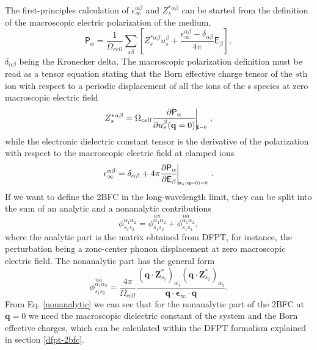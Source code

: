 The first-principles calculation of $\epsilon_{\infty}^{\alpha\beta}$ and $Z_{s}^{*\alpha\beta}$ can be started from the definition of the macroscopic electric polarization of the medium, 
\begin{equation}
 \mathsf{P}_{\alpha}=\frac{1}{\Omega_{cell}}\sum_{s\beta}\left[Z^{*\alpha\beta}_{s}u_{s}^{\beta}+\frac{\epsilon_{\infty}^{\alpha\beta}-\delta_{\alpha\beta}}{4\pi}\mathsf{E}_{\beta}\right],
\end{equation}
$\delta_{\alpha\beta}$ being the Kronecker delta. The macroscopic polarization definition must be read as a tensor equation stating that the Born effective charge tensor of the $s$th ion with respect to a periodic displacement of 
all the ions of the s species at zero macroscopic electric field
\begin{equation}
 Z^{*\alpha\beta}_{s}=\Omega_{cell}\frac{\partial \mathsf{P}_{\alpha}}{\partial u_{s}^{\beta}(\mathbf{q}=0)}\vline_{_{_{_{_{_{_{_{\boldsymbol{\mathsf{E}}=0}}}}}}}},
\end{equation}
while the electronic dielectric constant tensor is the derivative of the polarization with respect to the macroscopic electric field at clamped ions
\begin{equation}
 \epsilon_{\infty}^{\alpha\beta}=\delta_{\alpha\beta}+4\pi\frac{\partial\mathsf{P}_{\alpha}}{\partial\mathsf{E}_{\beta}}\vline_{_{_{_{_{_{_{_{\mathbf{u}_{s}(\mathbf{q}=0)=0}}}}}}}}.
\end{equation}
If we want to define the 2BFC in the long-wavelength limit, they can be split into the sum of an analytic and a nonanalytic contributions
\begin{equation}
 \phi_{s_{1}s_{2}}^{\alpha_{1}\alpha_{2}}=\overset{an}{\phi_{s_{1}s_{2}}^{\alpha_{1}\alpha_{2}}}+\overset{na}{\phi_{s_{1}s_{2}}^{\alpha_{1}\alpha_{2}}},
\end{equation}
where the analytic part is the matrix obtained from DFPT, for instance, the perturbation being a zone-center phonon displacement at zero macroscopic electric field. The nonanalytic part has the general form
\begin{equation}
\label{nonanalytic}
\overset{na}{\phi_{s_{1}s_{2}}^{\alpha_{1}\alpha_{2}}}=\frac{4\pi}{\Omega_{cell}}\frac{(\mathbf{q}\cdot\mathbf{Z}^{*}_{s_{1}})_{\alpha_{1}}(\mathbf{q}\cdot\mathbf{Z}^{*}_{s_{2}})_{\alpha_{2}}}{\mathbf{q}\cdot\boldsymbol{
\epsilon}_{\infty}\cdot\mathbf{q}}.
\end{equation}
From Eq. \ref{nonanalytic} we can see that for the nonanalytic part of the 2BFC at $\mathbf{q}=0$ we need the macroscopic dielectric constant of the system and the Born effective charges, which can be calculated within 
the DFPT formalism explained in section \ref{dfpt-2bfc}\cite{gonze1997dynamical}. \\

